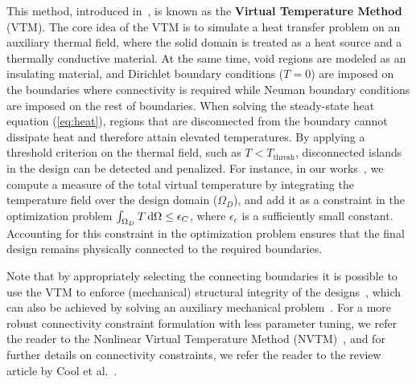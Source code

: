 This method, introduced in~\cite{li_structural_2016}, is known as the \textbf{Virtual Temperature Method} (VTM). The core idea of the VTM is to simulate a heat transfer problem on an auxiliary thermal field, where the solid domain
 is treated as a heat source and a thermally conductive material. At the same time, void regions are modeled as an
insulating material, and Dirichlet boundary conditions ($T = 0$) are imposed on the boundaries where connectivity is required while Neuman boundary conditions are imposed
on the rest of boundaries. When 
solving the steady-state heat equation (\eqref{eq:heat}), regions that are disconnected from the boundary 
cannot dissipate heat and therefore attain elevated temperatures. By applying a threshold criterion on the thermal field, such as $T < T_\text{thresh}$, disconnected islands in the design can be 
detected and penalized. For instance, in our works~\cite{ownpub1,ownpub2}, we compute a measure of the total virtual temperature
by integrating the temperature field over the design domain ($\Omega_D$), and add it as a constraint in the optimization problem 
$\int_{\Omega_D} T \mathop{}\!\text{d} \Omega \leq \epsilon_C$, where $\epsilon_c$ is a sufficiently small constant. Accounting for this constraint in the optimization problem ensures that the final design remains physically connected to the required 
boundaries. 


Note that by appropriately selecting the connecting boundaries it is possible to use the VTM to enforce
(mechanical) structural integrity of the designs~\cite{structural_heat}, which can also be achieved by solving an auxiliary
mechanical problem~\cite{structural_integrity}. For a more robust connectivity constraint formulation with less parameter tuning, we refer the reader to the Nonlinear 
Virtual Temperature Method (NVTM)~\cite{nvtm}, and for further details on connectivity constraints, we refer the reader to the review 
article by Cool et al.~\cite{vanessa}.
